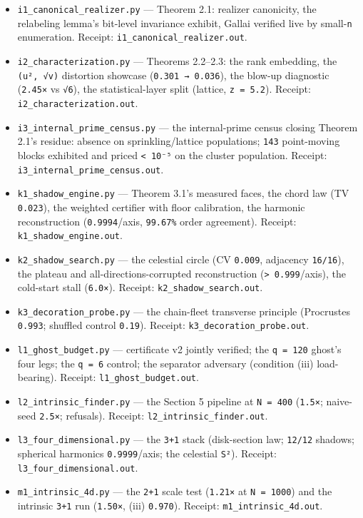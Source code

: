 \documentclass[11pt]{article}
\begin{document}
\begin{itemize}
\item \texttt{i1\_canonical\_realizer.py} — Theorem 2.1: realizer canonicity, the relabeling lemma's bit-level invariance exhibit, Gallai verified live by small-\texttt{n} enumeration. Receipt: \texttt{i1\_canonical\_realizer.out}.
\item \texttt{i2\_characterization.py} — Theorems 2.2–2.3: the rank embedding, the \texttt{(u², √v)} distortion showcase (\texttt{0.301 → 0.036}), the blow-up diagnostic (\texttt{2.45×} vs \texttt{√6}), the statistical-layer split (lattice, \texttt{z = 5.2}). Receipt: \texttt{i2\_characterization.out}.
\item \texttt{i3\_internal\_prime\_census.py} — the internal-prime census closing Theorem 2.1's residue: absence on sprinkling/lattice populations; \texttt{143} point-moving blocks exhibited and priced \texttt{< 10⁻⁵} on the cluster population. Receipt: \texttt{i3\_internal\_prime\_census.out}.
\item \texttt{k1\_shadow\_engine.py} — Theorem 3.1's measured faces, the chord law (TV \texttt{0.023}), the weighted certifier with floor calibration, the harmonic reconstruction (\texttt{0.9994}/axis, \texttt{99.67\%} order agreement). Receipt: \texttt{k1\_shadow\_engine.out}.
\item \texttt{k2\_shadow\_search.py} — the celestial circle (CV \texttt{0.009}, adjacency \texttt{16/16}), the plateau and all-directions-corrupted reconstruction (\texttt{> 0.999}/axis), the cold-start stall (\texttt{6.0×}). Receipt: \texttt{k2\_shadow\_search.out}.
\item \texttt{k3\_decoration\_probe.py} — the chain-fleet transverse principle (Procrustes \texttt{0.993}; shuffled control \texttt{0.19}). Receipt: \texttt{k3\_decoration\_probe.out}.
\item \texttt{l1\_ghost\_budget.py} — certificate v2 jointly verified; the \texttt{q = 120} ghost's four legs; the \texttt{q = 6} control; the separator adversary (condition (iii) load-bearing). Receipt: \texttt{l1\_ghost\_budget.out}.
\item \texttt{l2\_intrinsic\_finder.py} — the Section 5 pipeline at \texttt{N = 400} (\texttt{1.5×}; naive-seed \texttt{2.5×}; refusals). Receipt: \texttt{l2\_intrinsic\_finder.out}.
\item \texttt{l3\_four\_dimensional.py} — the \texttt{3+1} stack (disk-section law; \texttt{12/12} shadows; spherical harmonics \texttt{0.9999}/axis; the celestial \texttt{S²}). Receipt: \texttt{l3\_four\_dimensional.out}.
\item \texttt{m1\_intrinsic\_4d.py} — the \texttt{2+1} scale test (\texttt{1.21×} at \texttt{N = 1000}) and the intrinsic \texttt{3+1} run (\texttt{1.50×}, (iii) \texttt{0.970}). Receipt: \texttt{m1\_intrinsic\_4d.out}.
\end{itemize}
\end{document}
